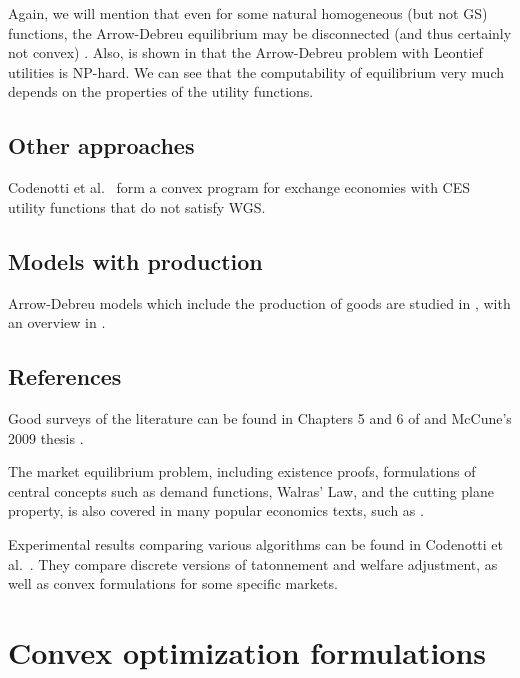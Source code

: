 \documentclass{article}
\begin{document}
Again, we will mention that even for some natural homogeneous (but not GS) functions, the Arrow-Debreu equilibrium may be disconnected (and thus certainly not convex) \cite{gjerstad1996multiple}.
Also, is shown in \cite{codenotti2006leontief} that the Arrow-Debreu problem with Leontief utilities is NP-hard.
We can see that the computability of equilibrium very much depends on the properties of the utility functions.


\subsection{Other approaches}
Codenotti et al.\ \cite{codenotti2005market,codenotti2005marketCES} form a convex program for exchange economies with CES utility functions that do not satisfy WGS.

\subsection{Models with production}
Arrow-Debreu models which include the production of goods are studied in \cite{garg2014computability,jain2005market,codenotti2005marketExcess}, with an overview in \cite[Chapters~5--6]{nisan2007algorithmic}. 

\subsection{References}
Good surveys of the literature can be found in Chapters 5 and 6 of \cite{nisan2007algorithmic} and McCune's 2009 thesis \cite{mccune2009algorithmic}.

The market equilibrium problem, including existence proofs, formulations of central concepts such as demand functions, Walras' Law, and the cutting plane property, is also covered in many popular economics texts, such as \cite{varian1992microeconomic, mas1995microeconomic, luenberger1995microeconomic, kreps1990course}.

Experimental results comparing various algorithms can be found in Codenotti et al.\ \cite{codenotti2008experimental}. They compare discrete versions of tatonnement and welfare adjustment, as well as convex formulations for some specific markets.


\section{Convex optimization formulations}
\end{document}
